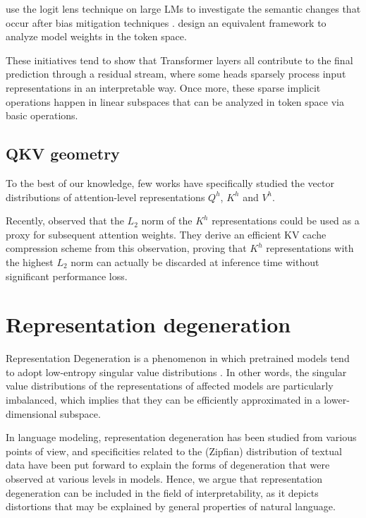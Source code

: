 \citet{prakash-lee-2023-layered} use the logit lens technique on large LMs to investigate the semantic changes that occur after bias mitigation techniques \citep{ravfogel-etal-2020-null}. \citet{dar-etal-2023-analyzing} design an equivalent framework to analyze model weights in the token space.

These initiatives tend to show that Transformer layers all contribute to the final prediction through a residual stream, where some heads sparsely process input representations in an interpretable way. Once more, these sparse implicit operations happen in linear subspaces that can be analyzed in token space via basic operations.

\subsection{QKV geometry}
To the best of our knowledge, few works have specifically studied the vector distributions of attention-level representations $Q^h$, $K^h$ and $V^h$.

Recently, \citet{devoto2024simpleeffectivel2normbased} observed that the $L_2$ norm of the $K^h$ representations could be used as a proxy for subsequent attention weights. They derive an efficient KV cache compression scheme from this observation, proving that $K^h$ representations with the highest $L_2$ norm can actually be discarded at inference time without significant performance loss.

\section{Representation degeneration}
\label{sec:rw_degeneration}

Representation Degeneration is a phenomenon in which pretrained models tend to adopt low-entropy singular value distributions \citep{jing2022understanding}. In other words, the singular value distributions of the representations of affected models are particularly imbalanced, which implies that they can be efficiently approximated in a lower-dimensional subspace.

In language modeling, representation degeneration has been studied from various points of view, and specificities related to the (Zipfian) distribution of textual data have been put forward to explain the forms of degeneration that were observed at various levels in models. Hence, we argue that representation degeneration can be included in the field of interpretability, as it depicts distortions that may be explained by general properties of natural language.

